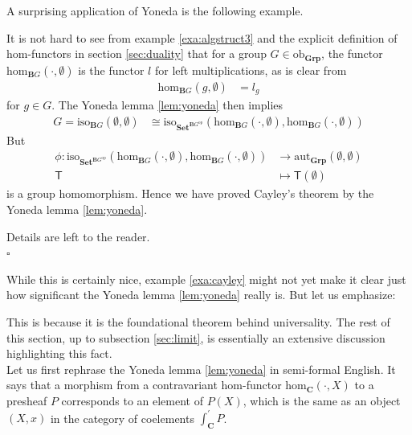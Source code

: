 A surprising application of Yoneda is the following example.
\\
\begin{exa}
\label{exa:cayley}
It is not hard to see from example \ref{exa:algstruct3} and the explicit definition of hom-functors in section \ref{sec:duality} that for a group $G \in \mathrm{ob}_{\mathbf{Grp}}$, the functor $\mathrm{hom}_{\mathbf{B}G}(\cdot,\emptyset)$ is the functor $l$ for left multiplications, as is clear from
\begin{align*}
  \mathrm{hom}_{\mathbf{B}G}(g,\emptyset)
  &=
  l_{g}
\end{align*}
for $g \in G$.
The Yoneda lemma \ref{lem:yoneda} then implies
\begin{align*}
  G
  =
  \mathrm{iso}_{\mathbf{B}G}(\emptyset,\emptyset)
  &\cong
  \mathrm{iso}_{\mathbf{Set}^{\mathbf{B}G^{\mathrm{op}}}}
  \left(
    \mathrm{hom}_{\mathbf{B}G}(\cdot,\emptyset),
    \mathrm{hom}_{\mathbf{B}G}(\cdot,\emptyset)
  \right)
\end{align*}
But
\begin{align*}
  \phi
  \colon
  \mathrm{iso}_{\mathbf{Set}^{\mathbf{B}G^{\mathrm{op}}}}
  \left(
    \mathrm{hom}_{\mathbf{B}G}(\cdot,\emptyset),
    \mathrm{hom}_{\mathbf{B}G}(\cdot,\emptyset)
  \right)
  &\rightarrow
  \mathrm{aut}_{\mathbf{Grp}}(\emptyset,\emptyset)
  \\
  \mathsf{T}
  &\mapsto
  \mathsf{T}(\emptyset)
\end{align*}
is a group homomorphism.
Hence we have proved Cayley's theorem by the Yoneda lemma \ref{lem:yoneda}.
\end{exa}
\begin{prf}
Details are left to the reader.
\\
\phantom{proven}
\hfill
$\square$
\end{prf}
While this is certainly nice, example \ref{exa:cayley} might not yet make it clear just how significant the Yoneda lemma \ref{lem:yoneda} really is.
But let us emphasize:
\begin{center}
\end{center}
This is because it is the foundational theorem behind universality.
The rest of this section, up to subsection \ref{sec:limit}, is essentially an extensive discussion highlighting this fact.
\\
Let us first rephrase the Yoneda lemma \ref{lem:yoneda} in semi-formal English.
It says that a morphism from a contravariant hom-functor $\mathrm{hom}_{\mathbf{C}}(\cdot,X)$ to a presheaf $P$ corresponds to an element of $P(X)$, which is the same as an object $(X,x)$ in the category of coelements $\int_{\mathbf{C}}^{\prime}P$.
